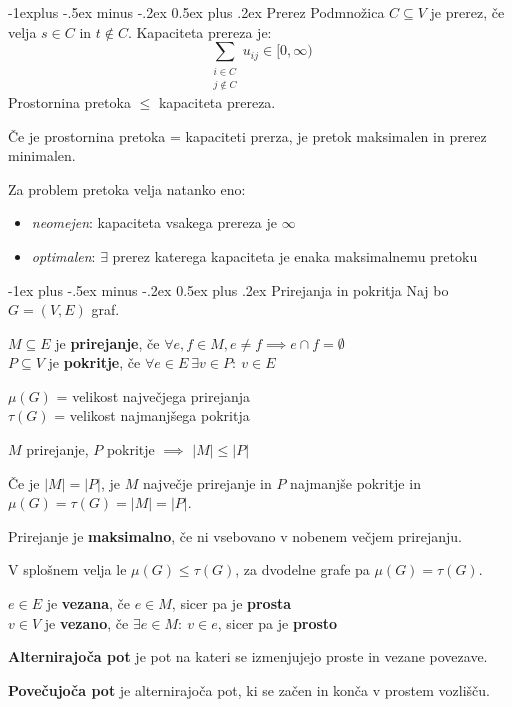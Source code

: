 \documentclass[a4paper,8pt]{extarticle}
\makeatletter
\renewcommand{\section}{\@startsection{section}{1}{0mm}%
                                {-1ex plus -.5ex minus -.2ex}%
                                {0.5ex plus .2ex}%
                                {\normalfont\large\bfseries}}
\renewcommand{\subsection}{\@startsection{subsection}{2}{0mm}%
                                {-1explus -.5ex minus -.2ex}%
                                {0.5ex plus .2ex}%
                                {\normalfont\normalsize\bfseries}}
\makeatother
\begin{document}
\begin{multicols}{4}
\subsection{Prerez}
Podmnožica $C \subseteq V$ je prerez, če velja $s \in C$ in $t \notin C$. Kapaciteta prereza je:
\[ \sum_{\substack{i \in C \\ j \notin C}} u_{ij} \in [0,\infty) \]
Prostornina pretoka $\leq$ kapaciteta prereza.

Če je prostornina pretoka = kapaciteti prerza, je pretok maksimalen in prerez minimalen.

Za problem pretoka velja natanko eno:
\begin{itemize}
	\item \emph{neomejen}: kapaciteta vsakega prereza je $\infty$
	\item \emph{optimalen}: $\exists$ prerez katerega kapaciteta je enaka maksimalnemu pretoku
\end{itemize}

\section{Prirejanja in pokritja}
Naj bo $G = (V, E)$ graf.

$M \subseteq E$ je \textbf{prirejanje}, če $\forall e, f \in M, e \neq f \implies e \cap f = \emptyset$ \\
$P \subseteq V$ je \textbf{pokritje}, če $\forall e \in E\ \exists v \in P:\ v \in E$

$\mu(G)$ = velikost največjega prirejanja \\
$\tau(G)$ = velikost najmanjšega pokritja

$M$ prirejanje, $P$ pokritje $\implies$ $|M| \leq |P|$

Če je $|M| = |P|$, je $M$ največje prirejanje in $P$ najmanjše pokritje in $\mu(G) = \tau(G) = |M| = |P|$.

Prirejanje je \textbf{maksimalno}, če ni vsebovano v nobenem večjem prirejanju.

V splošnem velja le $\mu(G) \leq \tau(G)$, za dvodelne grafe pa $\mu(G) = \tau(G)$.

$e \in E$ je \textbf{vezana}, če $e \in M$, sicer pa je \textbf{prosta}\\
$v \in V$ je \textbf{vezano}, če $\exists e \in M:\ v \in e$, sicer pa je \textbf{prosto}

\textbf{Alternirajoča pot} je pot na kateri se izmenjujejo proste in vezane povezave.

\textbf{Povečujoča pot} je alternirajoča pot, ki se začen in konča v prostem vozlišču.


\end{multicols}
\end{document}

